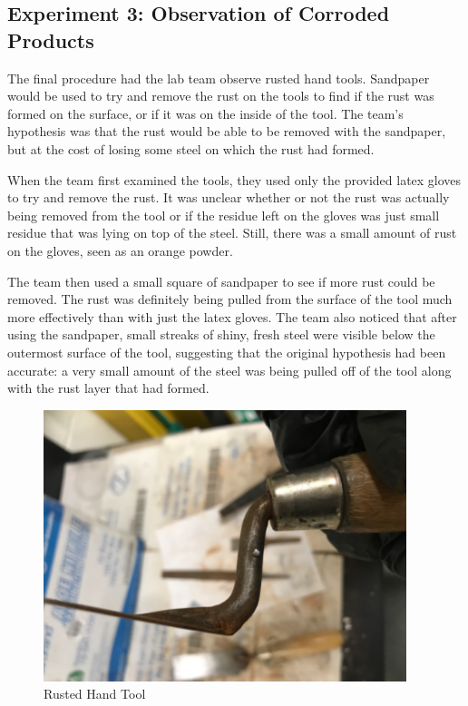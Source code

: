 \documentclass{article}
\begin{document}
{\subsection{Experiment 3: Observation of Corroded Products}
	The final procedure had the lab team observe rusted hand tools. Sandpaper would be used to try and remove the rust on the tools to find if the rust was formed on the surface, or if it was on the inside of the tool. The team’s hypothesis was that the rust would be able to be removed with the sandpaper, but at the cost of losing some steel on which the rust had formed.
    
	When the team first examined the tools, they used only the provided latex gloves to try and remove the rust. It was unclear whether or not the rust was actually being removed from the tool or if the residue left on the gloves was just small residue that was lying on top of the steel. Still, there was a small amount of rust on the gloves, seen as an orange powder. 
    
	The team then used a small square of sandpaper to see if more rust could be removed. The rust was definitely being pulled from the surface of the tool much more effectively than with just the latex gloves. The team also noticed that after using the sandpaper, small streaks of shiny, fresh steel were visible below the outermost surface of the tool, suggesting that the original hypothesis had been accurate: a very small amount of the steel was being pulled off of the tool along with the rust layer that had formed. 
    
\begin{figure}[ht]
\caption{Rusted Hand Tool}
\centering
\includegraphics[width=300pt]{HandTools.png}
\end{figure}
    
}
\end{document}
